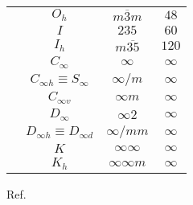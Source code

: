 \documentclass[a4paper, 11pt]{article}
\theoremstyle{definition}
\begin{document}
\begin{table}[tb]
\begin{tabular}{cccc}
    & $O_{h}$ & $m\overline{3}m$ & $48$ \\
    & $I$     & $235$            & $60$ \\
    & $I_{h}$ & $m\overline{35}$ & $120$ \\
    \hline
    & $C_{\infty}$                       & $\infty$          & $\infty$ \\
    & $C_{\infty h} \equiv S_{\infty}$   & $\infty / m$      & $\infty$ \\
    & $C_{\infty v}$                     & $\infty m$        & $\infty$ \\
    & $D_{\infty}$                       & $\infty 2$        & $\infty$ \\
    & $D_{\infty h} \equiv D_{\infty d}$ & $\infty / mm$     & $\infty$\\
    & $K$                                & $\infty \infty$   & $\infty$\\
    & $K_{h}$                            & $\infty \infty m$ & $\infty$\\
    \hline \hline
  \end{tabular}
\end{table}

Ref.~\cite{RevModPhys.35.641}





\end{document}
